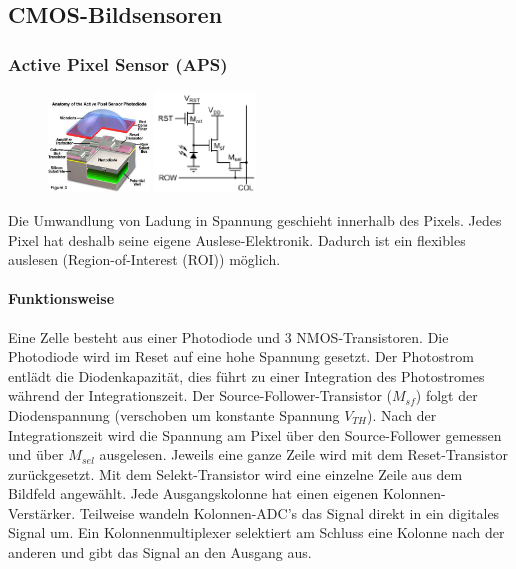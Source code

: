 \subsection{CMOS-Bildsensoren}
\subsubsection{Active Pixel Sensor (APS)}
\begin{figure}
    \vspace{-12pt}
    \centering
    \includegraphics[width=0.24\textwidth]{images/cmos_aps}
    \includegraphics[width=0.24\textwidth]{images/cmos_aps_aufbau}
\end{figure}
Die Umwandlung von Ladung in Spannung geschieht innerhalb des Pixels. Jedes Pixel hat deshalb seine eigene Auslese-Elektronik. Dadurch ist ein flexibles auslesen (Region-of-Interest (ROI)) möglich. 
\paragraph{Funktionsweise}
Eine Zelle besteht aus einer Photodiode und 3 NMOS-Transistoren. Die Photodiode wird im Reset auf eine hohe Spannung gesetzt. Der Photostrom entlädt die Diodenkapazität, dies führt zu einer Integration des Photostromes während der Integrationszeit. Der Source-Follower-Transistor ($M_{sf}$) folgt der Diodenspannung (verschoben um konstante Spannung $V_{TH}$). Nach der Integrationszeit wird die Spannung am Pixel über den Source-Follower gemessen und über $M_{sel}$ ausgelesen. Jeweils eine ganze Zeile wird mit dem Reset-Transistor zurückgesetzt. Mit dem Selekt-Transistor wird eine einzelne Zeile aus dem Bildfeld angewählt. Jede Ausgangskolonne hat einen eigenen Kolonnen-Verstärker. Teilweise wandeln Kolonnen-ADC's das Signal direkt in ein digitales Signal um. Ein Kolonnenmultiplexer selektiert am Schluss eine Kolonne nach der anderen und gibt das Signal an den Ausgang aus. \\

